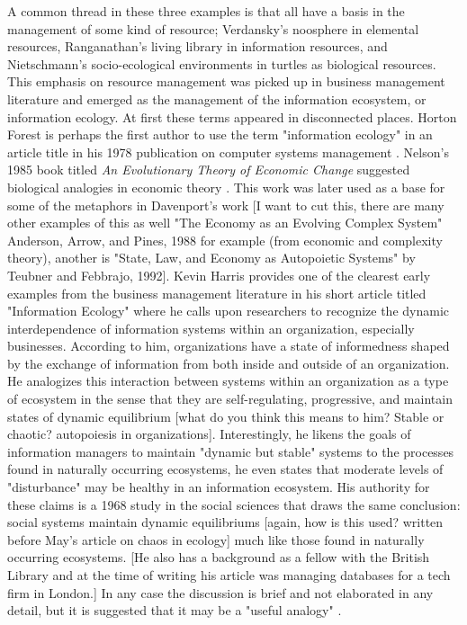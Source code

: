 A common thread in these three examples is that all have a basis in the management of some kind of resource; Verdansky's noosphere in elemental resources, Ranganathan's living library in information resources, and Nietschmann's socio-ecological environments in turtles as biological resources. This emphasis on resource management was picked up in business management literature and emerged as the management of the information ecosystem, or information ecology. At first these terms appeared in disconnected places. Horton Forest is perhaps the first author to use the term "information ecology" in an article title in his 1978 publication on computer systems management \citep{forest_1978}. Nelson's 1985 book titled \textit{An Evolutionary Theory of Economic Change} suggested biological analogies in economic theory \citep{nelson_evolutionary_1985}. This work was later used as a base for some of the metaphors in Davenport's work [I want to cut this, there are many other examples of this as well "The Economy as an Evolving Complex System" Anderson, Arrow, and Pines, 1988 for example (from economic and complexity theory), another is "State, Law, and Economy as Autopoietic Systems" by Teubner and Febbrajo, 1992]. Kevin Harris provides one of the clearest early examples from the business management literature in his short article titled "Information Ecology" where he calls upon researchers to recognize the dynamic interdependence of information systems within an organization, especially businesses. According to him, organizations have a state of informedness shaped by the exchange of information from both inside and outside of an organization. He analogizes this interaction between systems within an organization as a type of ecosystem in the sense that they are self-regulating, progressive, and maintain states of dynamic equilibrium [what do you think this means to him? Stable or chaotic? autopoiesis in organizations]. Interestingly, he likens the goals of information managers to maintain "dynamic but stable" systems to the processes found in naturally occurring ecosystems, he even states that moderate levels of "disturbance" may be healthy in an information ecosystem. His authority for these claims is a 1968 study in the social sciences that draws the same conclusion: social systems maintain dynamic equilibriums [again, how is this used? written before May's article on chaos in ecology] much like those found in naturally occurring ecosystems. [He also has a background as a fellow with the British Library and at the time of writing his article was managing databases for a tech firm in London.] In any case the discussion is brief and not elaborated in any detail, but it is suggested that it may be a "useful analogy" \citep{harris_information_1989}.

